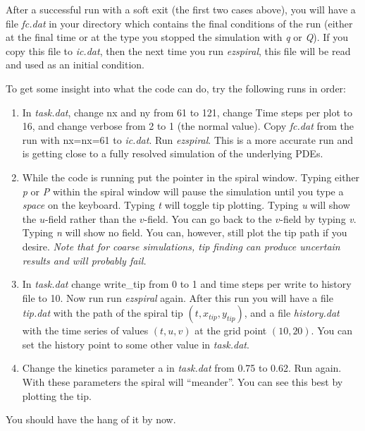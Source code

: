 \documentclass[12pt]{article}
\begin{document}
After a successful run with a soft exit (the first two cases above), you will
have a file {\em fc.dat} in your directory which contains the final conditions
of the run (either at the final time or at the type you stopped the simulation
with {\em q} or {\em Q}). If you copy this file to {\em ic.dat}, then the next
time you run {\em ezspiral}, this file will be read and used as an initial
condition.

To get some insight into what the code can do, try the following runs
in order:
\begin{enumerate}

\item
In {\em task.dat}, change {\sf nx} and {\sf ny} from 61 to 121, change {\sf
Time steps per plot} to 16, and change {\sf verbose} from 2 to 1 (the normal
value). Copy {\em fc.dat} from the run with {\sf nx}={\sf nx}=61 to {\em
ic.dat}. Run {\em ezspiral}.  This is a more accurate run and is getting close
to a fully resolved simulation of the underlying PDEs.

\item
While the code is running put the pointer in the spiral window.  Typing either
{\em p} or {\em P} within the spiral window will pause the simulation until
you type a {\em space} on the keyboard.  Typing {\em t} will toggle tip
plotting.  Typing {\em u} will show the $u$-field rather than the
$v$-field. You can go back to the $v$-field by typing {\em v}.  Typing {\em n}
will show no field. You can, however, still plot the tip path if you desire.
{\em Note that for coarse simulations, tip finding can produce uncertain
results and will probably fail.}

\item
In {\em task.dat} change {\sf write\_tip} from 0 to 1 and {\sf time steps per
write to history file} to 10.  Now run run {\em ezspiral} again.  After this
run you will have a file {\em tip.dat} with the path of the spiral tip $(t,
x_{tip}, y_{tip})$, and a file {\em history.dat} with the time series of
values $(t,u,v)$ at the grid point $(10,20)$.  You can set the history point
to some other value in {\em task.dat}.

\item
Change the kinetics parameter {\sf a} in {\em task.dat} from 0.75 to 0.62.
Run again. With these parameters the spiral will ``meander''. You can see this
best by plotting the tip.  


\end{enumerate}
You should have the hang of it by now.
\end{document}
